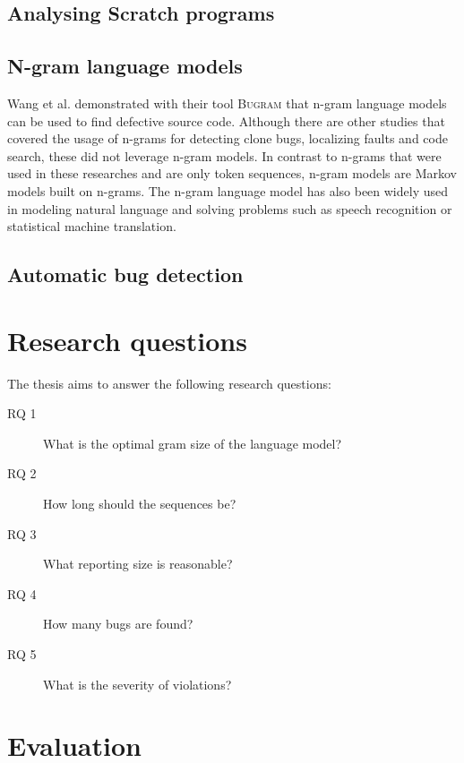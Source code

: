 \documentclass[
    numbers=noenddot,
    parskip=half-,
    fontsize=12pt,
    paper=a4,
    oneside,
    titlepage,
    bibliography=totoc,
    chapterprefix=false,
]{scrbook}
\newcommand{\bugram}{\textsc{Bugram}}
\begin{document}
    
    \section{Analysing Scratch programs}\label{sec:analyzing-scratch}

    \section{N-gram language models}\label{sec:language-models}
    Wang et al. demonstrated with their tool \bugram{} that n-gram language models can be used to find defective source code. Although there are other studies that covered the usage of n-grams for detecting clone bugs, localizing faults and code search, these did not leverage n-gram models. In contrast to n-grams that were used in these researches and are only token sequences, n-gram models are Markov models built on n-grams. The n-gram language model has also been widely used in modeling natural language and solving problems such as speech recognition or statistical machine translation.
    

    \section{Automatic bug detection}\label{sec:bugram}
    

    \chapter{Research questions}\label{ch:research-questions}
    The thesis aims to answer the following research questions:

    \begin{description}
        \item[RQ 1] What is the optimal gram size of the language model?
        \item[RQ 2] How long should the sequences be?
        \item[RQ 3] What reporting size is reasonable?
        \item[RQ 4] How many bugs are found?
        \item[RQ 5] What is the severity of violations?
    \end{description}


    \chapter{Evaluation}\label{ch:evaluation}
    
\end{document}
